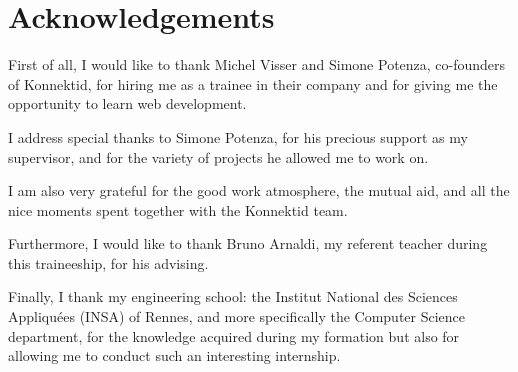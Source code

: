 \section{Acknowledgements}
\label{sec:thanks}

First of all, I would like to thank Michel {\sc Visser} and Simone {\sc Potenza}, co-founders of Konnektid, for hiring me as a trainee in their company and for giving me the opportunity to learn web development.

I address special thanks to Simone {\sc Potenza}, for his precious support as my supervisor, and for the variety of projects he allowed me to work on.

I am also very grateful for the good work atmosphere, the mutual aid, and all the nice moments spent together with the Konnektid team. 

Furthermore, I would like to thank Bruno {\sc Arnaldi}, my referent teacher during this traineeship, for his advising.

Finally, I thank my engineering school: the \guillemotleft{} Institut National des Sciences Appliquées \guillemotright{} (INSA) of Rennes,
and more specifically the Computer Science department, for the knowledge acquired during my formation but also for allowing me to conduct such an interesting internship.
